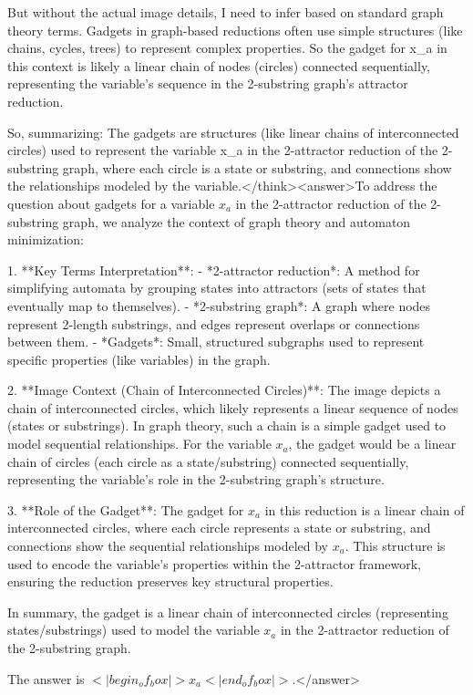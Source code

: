 But without the actual image details, I need to infer based on standard graph theory terms. Gadgets in graph-based reductions often use simple structures (like chains, cycles, trees) to represent complex properties. So the gadget for x_a in this context is likely a linear chain of nodes (circles) connected sequentially, representing the variable's sequence in the 2-substring graph's attractor reduction.

So, summarizing: The gadgets are structures (like linear chains of interconnected circles) used to represent the variable x_a in the 2-attractor reduction of the 2-substring graph, where each circle is a state or substring, and connections show the relationships modeled by the variable.</think><answer>To address the question about gadgets for a variable \( x_a \) in the 2-attractor reduction of the 2-substring graph, we analyze the context of graph theory and automaton minimization:  

1. **Key Terms Interpretation**:  
   - *2-attractor reduction*: A method for simplifying automata by grouping states into attractors (sets of states that eventually map to themselves).  
   - *2-substring graph*: A graph where nodes represent 2-length substrings, and edges represent overlaps or connections between them.  
   - *Gadgets*: Small, structured subgraphs used to represent specific properties (like variables) in the graph.  

2. **Image Context (Chain of Interconnected Circles)**:  
   The image depicts a chain of interconnected circles, which likely represents a linear sequence of nodes (states or substrings). In graph theory, such a chain is a simple gadget used to model sequential relationships. For the variable \( x_a \), the gadget would be a linear chain of circles (each circle as a state/substring) connected sequentially, representing the variable’s role in the 2-substring graph’s structure.  

3. **Role of the Gadget**:  
   The gadget for \( x_a \) in this reduction is a linear chain of interconnected circles, where each circle represents a state or substring, and connections show the sequential relationships modeled by \( x_a \). This structure is used to encode the variable’s properties within the 2-attractor framework, ensuring the reduction preserves key structural properties.  

In summary, the gadget is a linear chain of interconnected circles (representing states/substrings) used to model the variable \( x_a \) in the 2-attractor reduction of the 2-substring graph.  

The answer is \(<|begin_of_box|>x_a<|end_of_box|>\).</answer>